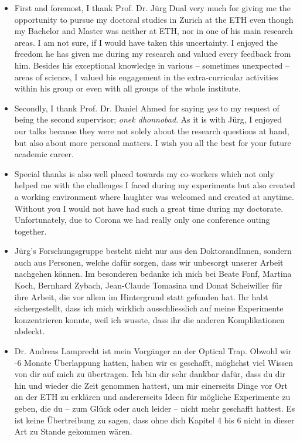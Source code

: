 \begin{itemize}[label=$\succ$]

  \item First and foremost, I thank Prof. Dr. Jürg Dual very much for giving me 
    the opportunity to pursue my doctoral studies in Zurich at the ETH even 
    though my Bachelor and Master was neither at ETH, nor in one of his main 
    research areas. I am not sure, if I would have taken this uncertainty. I 
    enjoyed the freedom he has given me during my research and valued every 
    feedback from him. Besides his exceptional knowledge in various -- 
    sometimes unexpected -- areas of science, I valued his engagement in the 
    extra-curricular activities within his group or even with all groups of the 
    whole institute.

  \item Secondly, I thank Prof. Dr. Daniel Ahmed for saying \emph{yes} to my 
    request of being the second supervisor; \emph{onek dhonnobad}. As it is 
    with Jürg, I enjoyed our talks because they were not solely about the 
    research questions at hand, but also about more personal matters. I wish 
    you all the best for your future academic career.

  \item Special thanks is also well placed towards my co-workers which not only 
  helped me with the challenges I faced during my experiments but also created 
  a working environment where laughter was welcomed and created at anytime. 
  Without you I would not have had such a great time during my doctorate. 
  Unfortunately, due to Corona we had really only one conference outing 
  together.

  \item Jürg's Forschungsgruppe besteht nicht nur aus den DoktorandInnen, 
    sondern auch aus Personen, welche dafür sorgen, dass wir unbesorgt unserer 
    Arbeit nachgehen können. Im besonderen bedanke ich mich bei Beate 
    Fonf, Martina Koch, Bernhard Zybach, Jean-Claude Tomasina und 
    Donat Scheiwiller für ihre Arbeit, die vor allem im Hintergrund statt 
    gefunden hat. Ihr habt sichergestellt, dass ich mich wirklich 
    ausschliesslich auf meine Experimente konzentrieren konnte, weil ich 
    wusste, dass ihr die anderen Komplikationen abdeckt.

  \item Dr. Andreas Lamprecht ist mein Vorgänger an der Optical Trap. Obwohl 
    wir -6 Monate Überlappung hatten, haben wir es geschafft, möglichst viel 
    Wissen von dir auf mich zu übertragen. Ich bin dir sehr dankbar dafür, dass 
    du dir hin und wieder die Zeit genommen hattest, um mir einerseits Dinge 
    vor Ort an der ETH zu erklären und andererseits Ideen für mögliche 
    Experimente zu geben, die du -- zum Glück oder auch leider -- nicht mehr 
    geschafft hattest. Es ist keine Übertreibung zu sagen, dass ohne dich 
    Kapitel 4 bis 6 nicht in dieser Art zu Stande gekommen wären.


\end{itemize}
